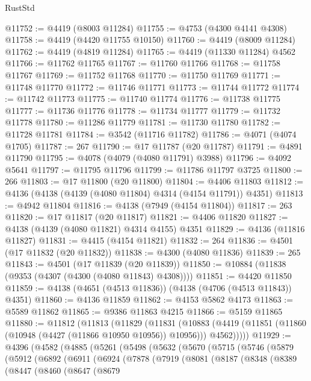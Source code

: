 \begin{lexlean}{RustStd}
\begin{coremodule}
@11752 := @4419 (@8003 @11284)
@11755 := @4753 (@4300 @4141 @4308)
@11758 := @4419 (@4420 @11755 @10150)
@11760 := @4419 (@8009 @11284)
@11762 := @4419 (@4819 @11284)
@11765 := @4419 (@11330 @11284) @4562
@11766 := @11762 @11765
@11767 := @11760 @11766
@11768 := @11758 @11767
@11769 := @11752 @11768
@11770 := @11750 @11769
@11771 := @11748 @11770
@11772 := @11746 @11771
@11773 := @11744 @11772
@11774 := @11742 @11773
@11775 := @11740 @11774
@11776 := @11738 @11775
@11777 := @11736 @11776
@11778 := @11734 @11777
@11779 := @11732 @11778
@11780 := @11286 @11779
@11781 := @11730 @11780
@11782 := @11728 @11781
@11784 := @3542 (@11716 @11782)
@11786 := @4071 (@4074 @1705)
@11787 := 267
@11790 := @17 @11787 (@20 @11787)
@11791 := @4891 @11790
@11795 := @4078 (@4079 (@4080 @11791) @3988)
@11796 := @4092 @5641
@11797 := @11795 @11796
@11799 := @11786 @11797 @3725
@11800 := 266
@11803 := @17 @11800 (@20 @11800)
@11804 := @4406 @11803
@11812 := @4136 (@4138 (@4139 (@4080 @11804) @4314 (@4154 @11791)) @4351)
@11813 := @4942 @11804
@11816 := @4138 (@7949 (@4154 @11804))
@11817 := 263
@11820 := @17 @11817 (@20 @11817)
@11821 := @4406 @11820
@11827 := @4138 (@4139 (@4080 @11821) @4314 @4155) @4351
@11829 := @4136 (@11816 @11827)
@11831 := @4415 (@4154 @11821)
@11832 := 264
@11836 := @4501 (@17 @11832 (@20 @11832))
@11838 := @4300 (@4080 @11836)
@11839 := 265
@11843 := @4501 (@17 @11839 (@20 @11839))
@11850 := @10884 (@11838 (@9353 (@4307 (@4300 (@4080 @11843) @4308))))
@11851 := @4420 @11850
@11859 := @4138 (@4651 (@4513 @11836)) (@4138 (@4706 (@4513 @11843)) @4351)
@11860 := @4136 @11859
@11862 := @4153 @5862 @4173
@11863 := @5589 @11862
@11865 := @9386 @11863 @4215
@11866 := @5159 @11865
@11880 := @11812
    (@11813
      (@11829
        (@11831
          (@10883 (@4419 (@11851 (@11860 (@10948 (@4427 (@11866 @10950 @10956)) @10956))) @4562)))))
@11929 := @4396
    (@4582
      (@4885
        (@5261
          (@5498
            (@5632
              (@5670
                (@5715
                  (@5746
                    (@5879
                      (@5912
                        (@6892
                          (@6911
                            (@6924
                              (@7878
                                (@7919
                                  (@8081
                                    (@8187
                                      (@8348
                                        (@8389
                                          (@8447
                                            (@8460
                                              (@8647
                                                (@8679

\end{coremodule}
\end{lexlean}
